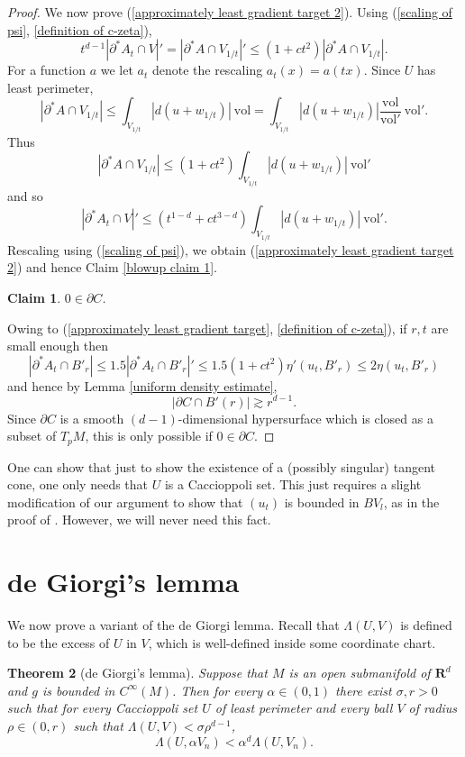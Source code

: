 \documentclass[reqno,12pt,letterpaper]{amsart}
\newcommand{\RR}{\mathbf{R}}
\newcommand{\vol}{\mathrm{vol}}
\newtheorem{theorem}{Theorem}[section]
\newtheorem{claim}[theorem]{Claim}
\theoremstyle{definition}
\numberwithin{equation}{section}
\begin{document}
\begin{proof}
We now prove (\ref{approximately least gradient target 2}).
Using (\ref{scaling of psi}, \ref{definition of c-zeta}),
$$t^{d - 1} | \partial^* A_t \cap V|' = |\partial^* A \cap V_{1/t}|' \leq (1 + ct^2) |\partial^* A \cap V_{1/t}|.$$
For a function $a$ we let $a_t$ denote the rescaling $a_t(x) = a(tx)$.
Since $U$ has least perimeter,
$$|\partial^* A \cap V_{1/t}| \leq \int_{V_{1/t}} |d(u + w_{1/t})| ~\vol = \int_{V_{1/t}} |d(u + w_{1/t})| \frac{\vol}{\vol'} ~\vol'.$$
Thus
$$|\partial^* A \cap V_{1/t}| \leq (1 + ct^2) \int_{V_{1/t}} |d(u + w_{1/t})| ~\vol'$$
and so
$$|\partial^* A_t \cap V|' \leq (t^{1 - d} + ct^{3 - d}) \int_{V_{1/t}} |d(u + w_{1/t})| ~\vol'.$$
Rescaling using (\ref{scaling of psi}), we obtain (\ref{approximately least gradient target 2}) and hence Claim \ref{blowup claim 1}.

\begin{claim}
$0 \in \partial C$.
\end{claim}

Owing to (\ref{approximately least gradient target}, \ref{definition of c-zeta}), if $r,t$ are small enough then
$$|\partial^* A_t \cap B'_r| \leq 1.5|\partial^* A_t \cap B'_r|' \leq 1.5(1 + ct^2) \eta'(u_t, B'_r) \leq 2 \eta(u_t, B'_r)$$
and hence by Lemma \ref{uniform density estimate},
$$|\partial C \cap B'(r)| \gtrsim r^{d - 1}.$$
Since $\partial C$ is a smooth $(d-1)$-dimensional hypersurface which is closed as a subset of $T_pM$, this is only possible if $0 \in \partial C$.
\end{proof}

One can show that just to show the existence of a (possibly singular) tangent cone, one only needs that $U$ is a Caccioppoli set.
This just requires a slight modification of our argument to show that $(u_t)$ is bounded in $BV_l$, as in the proof of \cite[Theorem 9.3]{Giusti77}.
However, we will never need this fact.


\section{de Giorgi's lemma}\label{DGL section}
We now prove a variant of the de Giorgi lemma. Recall that $\Lambda(U, V)$ is defined to be the excess of $U$ in $V$, which is well-defined inside some coordinate chart.

\begin{theorem}[de Giorgi's lemma]\label{DGL}
Suppose that $M$ is an open submanifold of $\RR^d$ and $g$ is bounded in $C^\infty(M)$.
Then for every $\alpha \in (0, 1)$ there exist $\sigma, r > 0$ such that for every Caccioppoli set $U$ of least perimeter and every ball $V$ of radius $\rho \in (0, r)$ such that $\Lambda(U, V) < \sigma \rho^{d - 1}$,
$$\Lambda(U, \alpha V_n) < \alpha^d \Lambda(U, V_n).$$
\end{theorem}
\end{document}

